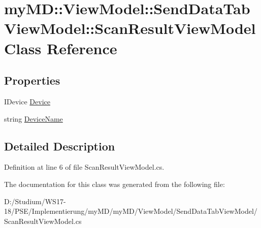 \hypertarget{classmy_m_d_1_1_view_model_1_1_send_data_tab_view_model_1_1_scan_result_view_model}{
\section{my\-MD::View\-Model::Send\-Data\-Tab\-View\-Model::Scan\-Result\-View\-Model Class Reference}
\label{d1/d46/classmy_m_d_1_1_view_model_1_1_send_data_tab_view_model_1_1_scan_result_view_model}
}
\subsection*{Properties}
\begin{CompactItemize}
\item 
\hypertarget{classmy_m_d_1_1_view_model_1_1_send_data_tab_view_model_1_1_scan_result_view_model_e0ac20adce6ffee48c7151b070aa5737}{
IDevice \hyperlink{classmy_m_d_1_1_view_model_1_1_send_data_tab_view_model_1_1_scan_result_view_model_e0ac20adce6ffee48c7151b070aa5737}{Device}}
\label{d1/d46/classmy_m_d_1_1_view_model_1_1_send_data_tab_view_model_1_1_scan_result_view_model_e0ac20adce6ffee48c7151b070aa5737}

\item 
\hypertarget{classmy_m_d_1_1_view_model_1_1_send_data_tab_view_model_1_1_scan_result_view_model_ffc7ade23d97245d93a45587d2b15ae8}{
string \hyperlink{classmy_m_d_1_1_view_model_1_1_send_data_tab_view_model_1_1_scan_result_view_model_ffc7ade23d97245d93a45587d2b15ae8}{Device\-Name}}
\label{d1/d46/classmy_m_d_1_1_view_model_1_1_send_data_tab_view_model_1_1_scan_result_view_model_ffc7ade23d97245d93a45587d2b15ae8}

\end{CompactItemize}


\subsection{Detailed Description}




Definition at line 6 of file Scan\-Result\-View\-Model.cs.

The documentation for this class was generated from the following file:\begin{CompactItemize}
\item 
D:/Studium/WS17-18/PSE/Implementierung/my\-MD/my\-MD/View\-Model/Send\-Data\-Tab\-View\-Model/Scan\-Result\-View\-Model.cs\end{CompactItemize}

